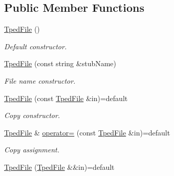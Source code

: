 \subsection*{Public Member Functions}
\begin{DoxyCompactItemize}
\item 
\mbox{\label{classsamp_files_1_1_tped_file_abdace961bb5b8b5950ae122c5979c557}} 
\hyperlink{classsamp_files_1_1_tped_file_abdace961bb5b8b5950ae122c5979c557}{Tped\+File} ()
\begin{DoxyCompactList}\small\item\em Default constructor. \end{DoxyCompactList}\item 
\hyperlink{classsamp_files_1_1_tped_file_a9796141665192340a076db97810c6699}{Tped\+File} (const string \&stub\+Name)
\begin{DoxyCompactList}\small\item\em File name constructor. \end{DoxyCompactList}\item 
\mbox{\label{classsamp_files_1_1_tped_file_a71a38e409acaed856c3e5ffdccc2106e}} 
\hyperlink{classsamp_files_1_1_tped_file_a71a38e409acaed856c3e5ffdccc2106e}{Tped\+File} (const \hyperlink{classsamp_files_1_1_tped_file}{Tped\+File} \&in)=default
\begin{DoxyCompactList}\small\item\em Copy constructor. \end{DoxyCompactList}\item 
\mbox{\label{classsamp_files_1_1_tped_file_aae92ede357d8158f6499a57120d85ec6}} 
\hyperlink{classsamp_files_1_1_tped_file}{Tped\+File} \& \hyperlink{classsamp_files_1_1_tped_file_aae92ede357d8158f6499a57120d85ec6}{operator=} (const \hyperlink{classsamp_files_1_1_tped_file}{Tped\+File} \&in)=default
\begin{DoxyCompactList}\small\item\em Copy assignment. \end{DoxyCompactList}\item 
\mbox{\label{classsamp_files_1_1_tped_file_a258274e19e9455721f09540d30a103b3}} 
\hyperlink{classsamp_files_1_1_tped_file_a258274e19e9455721f09540d30a103b3}{Tped\+File} (\hyperlink{classsamp_files_1_1_tped_file}{Tped\+File} \&\&in)=default

\end{DoxyCompactItemize}

